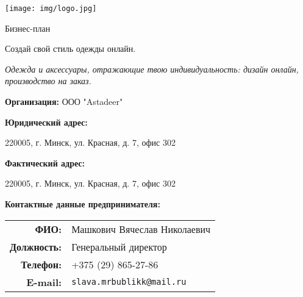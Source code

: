 \begin{titlepage}
\centering

\vspace*{-3cm} %
\texttt{[image: img/logo.jpg]} %
\vspace{1.5cm}

{\selectfont\Huge Бизнес-план\par} %
\vspace{0.8cm}

{\selectfont\Huge Создай свой стиль одежды онлайн.\par} %
\vspace{0.4cm}

{\textit{Одежда и аксессуары, отражающие твою индивидуальность: дизайн онлайн, производство на заказ.}\par}
\vspace{1.5cm}

{\Large \textbf{Организация:} ООО "Astadeer" \par}
\vspace{0.4cm}

{\textbf{Юридический адрес:} \par}
220005, г. Минск, ул. Красная, д. 7, офис 302 \par
\vspace{0.2cm}

{\textbf{Фактический адрес:} \par}
220005, г. Минск, ул. Красная, д. 7, офис 302 \par
\vspace{0.4cm}

{\Large \textbf{Контактные данные предпринимателя:} \par}
\vspace{0.2cm}

\begin{tabular}{rl}
    \textbf{ФИО:} & Машкович Вячеслав Николаевич \\
    \textbf{Должность:} & Генеральный директор \\
    \textbf{Телефон:} & +375 (29) 865-27-86 \\
    \textbf{E-mail:} & \texttt{slava.mrbublikk@mail.ru} \\ %
\end{tabular}
\vspace{0.4cm}


\end{titlepage}
